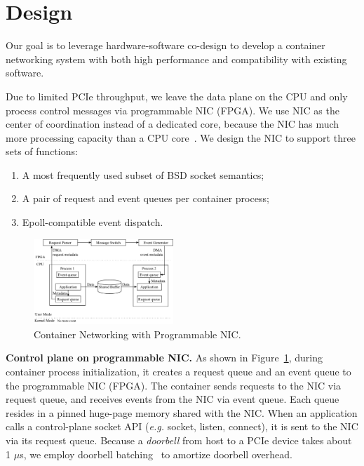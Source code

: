 \section{Design}
\label{sec:design}

Our goal is to leverage hardware-software co-design to develop a container networking system with both high performance and compatibility with existing software.

Due to limited PCIe throughput, we leave the data plane on the CPU and only process control messages via programmable NIC (FPGA).
We use NIC as the center of coordination instead of a dedicated core, because the NIC has much more processing capacity than a CPU core~\cite{li2016clicknp}.
We design the NIC to support three sets of functions:
\begin{enumerate}
\item A most frequently used subset of BSD socket semantics;
\item A pair of request and event queues per container process;
\item Epoll-compatible event dispatch.
\end{enumerate}

\begin{figure}[t]
\includegraphics[width=0.47\textwidth]{ipc_msg_lifecycle_2.pdf}
\caption{Container Networking with Programmable NIC.}
\label{fig:arch}
\vspace{-0.2in}
\end{figure}

\textbf{Control plane on programmable NIC.}
As shown in Figure~\ref{fig:arch}, during container process initialization, it creates a request queue and an event queue to the programmable NIC (FPGA).
The container sends requests to the NIC via request queue, and receives events from the NIC via event queue.
Each queue resides in a pinned huge-page memory shared with the NIC.
When an application calls a control-plane socket API (\textit{e.g.} socket, listen, connect), it is sent to the NIC via its request queue.
Because a \textit{doorbell} from host to a PCIe device takes about 1 $\mu$s, we employ doorbell batching~\cite{kaminsky2016design} to amortize doorbell overhead.

